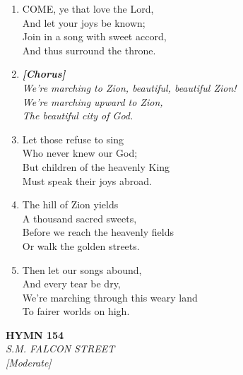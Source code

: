 \documentclass[11pt,a4paper]{article}
\begin{document}
\begin{enumerate}
    \item COME, ye that love the Lord, \\
        And let your joys be known; \\
        Join in a song with sweet accord, \\
        And thus surround the throne.

    \item[] \vspace{0.4em}
    \textbf{\textit{[Chorus]}} \\
    \textit{We're marching to Zion, beautiful, beautiful Zion!} \\
    \textit{We're marching upward to Zion,} \\
    \textit{The beautiful city of God.}
    \vspace{0.4em}

    \item Let those refuse to sing \\
        Who never knew our God; \\
        But children of the heavenly King \\
        Must speak their joys abroad.

    \item The hill of Zion yields \\
        A thousand sacred sweets, \\
        Before we reach the heavenly fields \\
        Or walk the golden streets.

    \item Then let our songs abound, \\
        And every tear be dry, \\
        We're marching through this weary land \\
        To fairer worlds on high.

\end{enumerate}

\newpage
\begin{center}
    {\Large \textbf{HYMN 154}}
    \\
    \textit{S.M. FALCON STREET}
    \\
    \textit{\small [Moderate]}
\end{center}
\vspace{1em}
\end{document}
